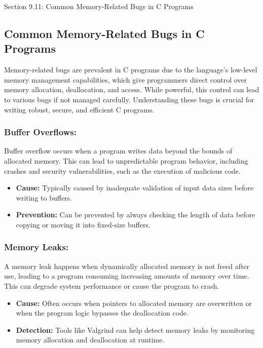 \begin{notes}{Section 9.11: Common Memory-Related Bugs in C Programs}
    \subsection*{Common Memory-Related Bugs in C Programs}

    Memory-related bugs are prevalent in C programs due to the language's low-level memory management capabilities, which give programmers direct control over memory allocation, deallocation, and 
    access. While powerful, this control can lead to various bugs if not managed carefully. Understanding these bugs is crucial for writing robust, secure, and efficient C programs. \vspace*{1em}
    
    \subsubsection*{Buffer Overflows:}
    
    Buffer overflow occurs when a program writes data beyond the bounds of allocated memory. This can lead to unpredictable program behavior, including crashes and security vulnerabilities, such as 
    the execution of malicious code.
    
    \begin{itemize}
        \item \textbf{Cause:} Typically caused by inadequate validation of input data sizes before writing to buffers.
        \item \textbf{Prevention:} Can be prevented by always checking the length of data before copying or moving it into fixed-size buffers.
    \end{itemize}
    
    \subsubsection*{Memory Leaks:}
    
    A memory leak happens when dynamically allocated memory is not freed after use, leading to a program consuming increasing amounts of memory over time. This can degrade system performance or cause 
    the program to crash.
    
    \begin{itemize}
        \item \textbf{Cause:} Often occurs when pointers to allocated memory are overwritten or when the program logic bypasses the deallocation code.
        \item \textbf{Detection:} Tools like Valgrind can help detect memory leaks by monitoring memory allocation and deallocation at runtime.
    \end{itemize}
    

\end{notes}

